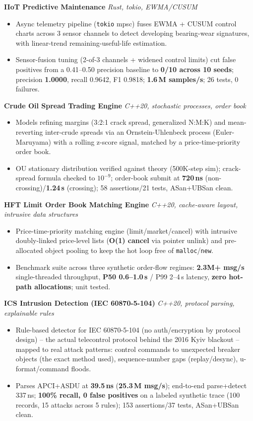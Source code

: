 \documentclass[10pt]{article}
\newcommand{\projectentry}[2]{%
  \noindent\textbf{#1} \hfill \textit{#2}\\[-0.3em]
}
\begin{document}
\projectentry{IIoT Predictive Maintenance}{Rust, tokio, EWMA/CUSUM}
\begin{itemize}
  \item Async telemetry pipeline (\texttt{tokio} mpsc) fuses EWMA + CUSUM control charts across 3 sensor channels to detect developing bearing-wear signatures, with linear-trend remaining-useful-life estimation.
  \item Sensor-fusion tuning (2-of-3 channels + widened control limits) cut false positives from a 0.41--0.50 precision baseline to \textbf{0/10 across 10 seeds}; precision \textbf{1.0000}, recall 0.9642, F1 0.9818; \textbf{1.6\,M samples/s}; 26 tests, 0 failures.
\end{itemize}

\projectentry{Crude Oil Spread Trading Engine}{C++20, stochastic processes, order book}
\begin{itemize}
  \item Models refining margins (3:2:1 crack spread, generalized N:M:K) and mean-reverting inter-crude spreads via an Ornstein-Uhlenbeck process (Euler-Maruyama) with a rolling z-score signal, matched by a price-time-priority order book.
  \item OU stationary distribution verified against theory (500K-step sim); crack-spread formula checked to $10^{-9}$; order-book submit at \textbf{720\,ns} (non-crossing)/\textbf{1.24\,\textmu s} (crossing); 58 assertions/21 tests, ASan+UBSan clean.
\end{itemize}

\projectentry{HFT Limit Order Book Matching Engine}{C++20, cache-aware layout, intrusive data structures}
\begin{itemize}
  \item Price-time-priority matching engine (limit/market/cancel) with intrusive doubly-linked price-level lists (\textbf{O(1) cancel} via pointer unlink) and pre-allocated object pooling to keep the hot loop free of \texttt{malloc}/\texttt{new}.
  \item Benchmark suite across three synthetic order-flow regimes: \textbf{2.3M+ msg/s} single-threaded throughput, \textbf{P50 0.6--1.0\,\textmu s} / P99 2--4\,\textmu s latency, \textbf{zero hot-path allocations}; unit tested.
\end{itemize}

\projectentry{ICS Intrusion Detection (IEC 60870-5-104)}{C++20, protocol parsing, explainable rules}
\begin{itemize}
  \item Rule-based detector for IEC 60870-5-104 (no auth/encryption by protocol design) -- the actual telecontrol protocol behind the 2016 Kyiv blackout -- mapped to real attack patterns: control commands to unexpected breaker objects (the exact method used), sequence-number gaps (replay/desync), u-format/command floods.
  \item Parses APCI+ASDU at \textbf{39.5\,ns} (\textbf{25.3\,M msg/s}); end-to-end parse+detect 337\,ns; \textbf{100\% recall, 0 false positives} on a labeled synthetic trace (100 records, 15 attacks across 5 rules); 153 assertions/37 tests, ASan+UBSan clean.
\end{itemize}
\end{document}
